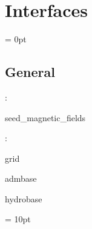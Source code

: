 
\section{Interfaces} 


\parskip = 0pt

\vspace{3mm} \subsection*{General}

: 

seed\_magnetic\_fields
\vspace{2mm}

: 

grid

admbase

hydrobase
\vspace{2mm}

\vspace{5mm}\parskip = 10pt 
